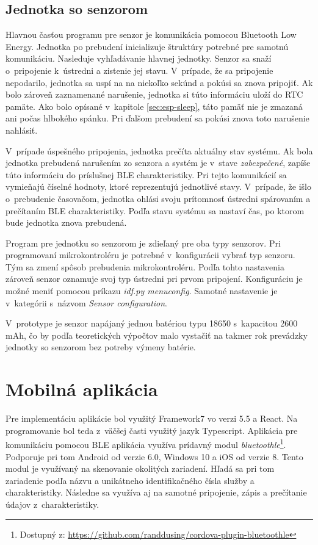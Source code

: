 \subsection{Jednotka so senzorom}

Hlavnou časťou programu pre senzor je komunikácia pomocou Bluetooth Low Energy. Jednotka po prebudení inicializuje štruktúry potrebné pre samotnú komunikáciu. Nasleduje vyhľadávanie hlavnej jednotky. Senzor sa snaží o~pripojenie k~ústredni a zistenie jej stavu. V~prípade, že sa pripojenie nepodarilo, jednotka sa uspí na na niekoľko sekúnd a pokúsi sa znova pripojiť. Ak bolo zároveň zaznamenané narušenie, jednotka si túto informáciu uloží do RTC pamäte. Ako bolo opísané v~kapitole \ref{sec:esp-sleep}, táto pamäť nie je zmazaná ani počas hlbokého spánku. Pri ďalšom prebudení sa pokúsi znova toto narušenie nahlásiť.

V~prípade úspešného pripojenia, jednotka prečíta aktuálny stav systému. Ak bola jednotka prebudená narušením zo senzora a systém je v~stave \textit{zabezpečené}, zapíše túto informáciu do príslušnej BLE charakteristiky. Pri tejto komunikácií sa vymieňajú číselné hodnoty, ktoré reprezentujú jednotlivé stavy. V~prípade, že išlo o~prebudenie časovačom, jednotka ohlási svoju prítomnosť ústredni spárovaním a prečítaním BLE charakteristiky. Podľa stavu systému sa nastaví čas, po ktorom bude jednotka znova prebudená.

Program pre jednotku so senzorom je zdieľaný pre oba typy senzorov. Pri programovaní mikrokontroléru je potrebné v~konfigurácii vybrať typ senzoru. Tým sa zmení spôsob prebudenia mikrokontroléru. Podľa tohto nastavenia zároveň senzor oznamuje svoj typ ústredni pri prvom pripojení. Konfiguráciu je možné meniť pomocou príkazu \textit{idf.py menuconfig}. Samotné nastavenie je v~kategórii s~názvom \textit{Sensor configuration}.

V~prototype je senzor napájaný jednou batériou typu 18650 s~kapacitou 2600 mAh, čo by podľa teoretických výpočtov malo vystačiť na takmer rok prevádzky jednotky so senzorom bez potreby výmeny batérie.

\section{Mobilná aplikácia}

Pre implementáciu aplikácie bol využitý Framework7 vo verzi 5.5 a React. Na programovanie bol teda z~väčšej časti využitý jazyk Typescript. Aplikácia pre komunikáciu pomocou BLE aplikácia využíva prídavný modul \textit{bluetoothle}\footnote{Dostupný z: \url{https://github.com/randdusing/cordova-plugin-bluetoothle}}. Podporuje pri tom Android od verzie 6.0, Windows 10 a iOS od verzie 8. Tento modul je využívaný na skenovanie okolitých zariadení. Hľadá sa pri tom zariadenie podľa názvu a unikátneho identifikačného čísla služby a charakteristiky. Následne sa využíva aj na samotné pripojenie, zápis a prečítanie údajov z~charakteristiky.

